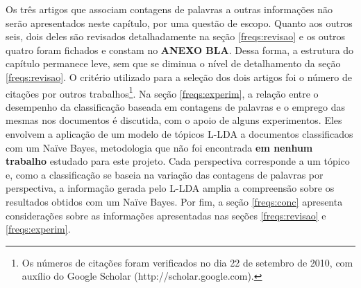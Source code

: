 
Os três artigos que associam contagens de palavras a outras informações não serão apresentados neste capítulo, por uma questão de escopo. Quanto aos outros seis, dois deles são revisados detalhadamente na seção \ref{freqs:revisao} e os outros quatro foram fichados e constam no \textbf{ANEXO BLA}. Dessa forma, a estrutura do capítulo permanece leve, sem que se diminua o nível de detalhamento da seção \ref{freqs:revisao}. O critério utilizado para a seleção dos dois artigos foi o número de citações por outros trabalhos\footnote{Os números de citações foram verificados no dia 22 de setembro de 2010, com auxílio do Google Scholar (http://scholar.google.com).}. Na seção \ref{freqs:experim}, a relação entre o desempenho da classificação baseada em contagens de palavras e o emprego das mesmas nos documentos é discutida, com o apoio de alguns experimentos. Eles envolvem a aplicação de um modelo de tópicos L-LDA a documentos classificados com um Naïve Bayes, metodologia que não foi encontrada \textbf{em nenhum trabalho} estudado para este projeto. Cada perspectiva corresponde a um tópico e, como a classificação se baseia na variação das contagens de palavras por perspectiva, a informação gerada pelo L-LDA amplia a compreensão sobre os resultados obtidos com um Naïve Bayes. Por fim, a seção \ref{freqs:conc} apresenta considerações sobre as informações apresentadas nas seções \ref{freqs:revisao} e \ref{freqs:experim}. 






